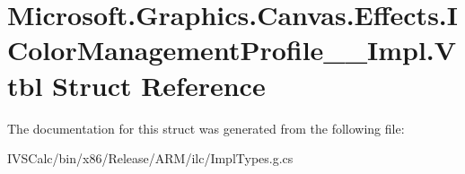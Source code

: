\hypertarget{struct_microsoft_1_1_graphics_1_1_canvas_1_1_effects_1_1_i_color_management_profile_____impl_1_1_vtbl}{}\section{Microsoft.\+Graphics.\+Canvas.\+Effects.\+I\+Color\+Management\+Profile\+\_\+\+\_\+\+Impl.\+Vtbl Struct Reference}
\label{struct_microsoft_1_1_graphics_1_1_canvas_1_1_effects_1_1_i_color_management_profile_____impl_1_1_vtbl}


The documentation for this struct was generated from the following file\+:\begin{DoxyCompactItemize}
\item 
I\+V\+S\+Calc/bin/x86/\+Release/\+A\+R\+M/ilc/Impl\+Types.\+g.\+cs\end{DoxyCompactItemize}
